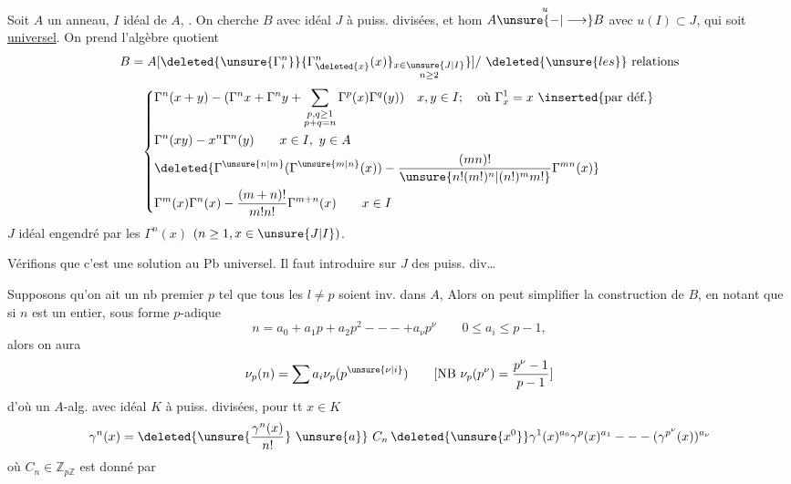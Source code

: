 Soit $A$ un anneau, $I$ idéal de $A$, . On cherche  $B$ avec idéal $J$ à puiss. divisées, et hom $A\overset{u}{\unsure{-|\longrightarrow}}B$ avec $u(I)\subset J$, qui soit \uline{universel}. On prend l'algèbre quotient
\[
B=A[\deleted{\unsure{\Gamma_i^n}}\{\Gamma_{\deleted{x}}^n(x)\}_{\substack{x\in\unsure{J|I}\\n\geq2}}\}]/\ \deleted{\unsure{les}}\ \text{relations}
\]
\[
\left\{\begin{aligned}
&\Gamma^n(x+y)-(\Gamma^n x+\Gamma^n y+\sum_{\substack{p,q\geq1\\p+q=n}}\Gamma^p(x)\Gamma^q(y))\quad x,y\in I;\quad\text{où }\Gamma_x^1=x\ \inserted{\text{par déf.}}\\
&\Gamma^n(xy)-x^n\Gamma^n(y)\qquad x\in I,\ y\in A\\
&\deleted{\Gamma^{\unsure{n|m}}(\Gamma^{\unsure{m|n}}(x))-\frac{(mn)!}{\unsure{n!(m!)^n|(n!)^m m!}}\Gamma^{mn}(x)}\\
&\Gamma^m(x)\Gamma^n(x)-\frac{(m+n)!}{m!n!}\Gamma^{m+n}(x)\qquad x\in I
\end{aligned}\right.
\]
 \uline{$J$} idéal engendré par les $\Gamma^n(x)$ $(n\geq1,x\in\unsure{J|I})$.


Vérifions que c'est une solution au Pb universel. Il faut introduire sur $J$ des puiss. div\ldots


Supposons qu'on ait un nb premier $p$ tel que tous les $l\ne p$ soient inv. dans $A$,  Alors on peut simplifier la construction de $B$, en notant que si $n$ est un entier, sous forme $p$-adique 
\[
n=a_0+a_1p+a_2p^2---+a_\nu p^\nu\qquad0\leq a_i\leq p-1,
\]
alors on aura
\[
\nu_p(n)=\sum a_i\nu_p(p^{\unsure{\nu|i}})\qquad[\mathrm{NB}\ \nu_p(p^\nu)=\frac{p^\nu-1}{p-1}]
\]
d'où  un $A$-alg. avec idéal $K$ à puiss. divisées, pour tt $x\in K$
\[
\gamma^n(x)=\deleted{\unsure{\frac{\gamma^n(x)}{n!}}\ \unsure{a}}\ C_n\,\deleted{\unsure{x^0}}\gamma^1(x)^{a_0}\gamma^p(x)^{a_1}---(\gamma^{p^\nu}(x))^{a_\nu}
\]
où $C_n\in\mathbb Z_{p\mathbb Z}$ est donné par


